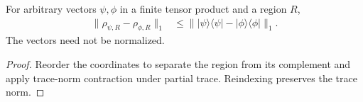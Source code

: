 \begin{theorem}
  \label{thm:regional_pure_trace_norm_contraction}
  \leanok
  For arbitrary vectors $\psi,\phi$ in a finite tensor product and a region $R$,
  \begin{align}
    \label{eq:regional_pure_trace_norm_contraction}
    \lVert\rho_{\psi,R}-\rho_{\phi,R}\rVert_1
      &\le\lVert\lvert\psi\rangle\langle\psi\rvert
        -\lvert\phi\rangle\langle\phi\rvert\rVert_1.
  \end{align}
  The vectors need not be normalized.
\end{theorem}
\begin{proof}\leanok
  Reorder the coordinates to separate the region from its complement and
  apply trace-norm contraction under partial trace. Reindexing preserves
  the trace norm.
\end{proof}
